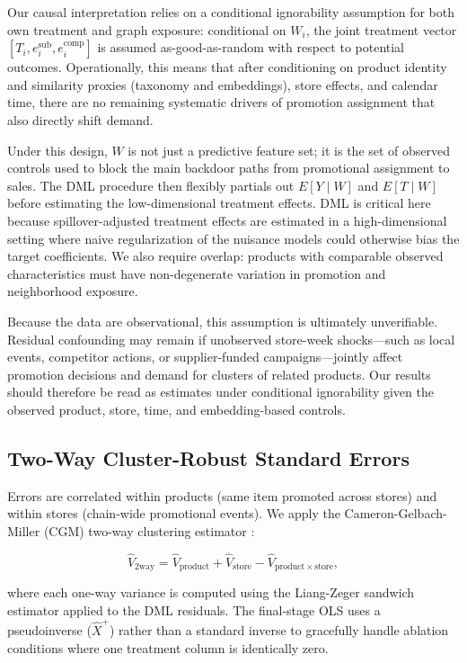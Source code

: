 \documentclass[conference]{IEEEtran}
\begin{document}
Our causal interpretation relies on a conditional ignorability assumption for
both own treatment and graph exposure: conditional on $W_i$, the joint
treatment vector $[T_i, e_i^{\mathrm{sub}}, e_i^{\mathrm{comp}}]$ is assumed
as-good-as-random with respect to potential outcomes.
Operationally, this means that after conditioning on product identity and
similarity proxies (taxonomy and embeddings), store effects, and calendar
time, there are no remaining systematic drivers of promotion assignment that
also directly shift demand.

Under this design, $W$ is not just a predictive feature set; it is the set of
observed controls used to block the main backdoor paths from promotional
assignment to sales.
The DML procedure then flexibly partials out $E[Y \mid W]$ and
$E[T \mid W]$ before estimating the low-dimensional treatment effects.
DML is critical here because spillover-adjusted treatment effects are
estimated in a high-dimensional setting where naive regularization of the
nuisance models could otherwise bias the target coefficients.
We also require overlap: products with comparable observed characteristics
must have non-degenerate variation in promotion and neighborhood exposure.

Because the data are observational, this assumption is ultimately
unverifiable.
Residual confounding may remain if unobserved store-week shocks---such as
local events, competitor actions, or supplier-funded campaigns---jointly
affect promotion decisions and demand for clusters of related products.
Our results should therefore be read as estimates under conditional
ignorability given the observed product, store, time, and embedding-based
controls.

\subsection{Two-Way Cluster-Robust Standard Errors}

Errors are correlated within products (same item promoted across stores)
and within stores (chain-wide promotional events).
We apply the Cameron-Gelbach-Miller (CGM) two-way clustering
estimator \cite{cameron2011robust}:

\begin{equation}
    \hat{V}_{\mathrm{2way}} = \hat{V}_{\mathrm{product}}
    + \hat{V}_{\mathrm{store}}
    - \hat{V}_{\mathrm{product}\times\mathrm{store}},
    \label{eq:cgm}
\end{equation}

\noindent where each one-way variance is computed using the Liang-Zeger
sandwich estimator \cite{liang1986longitudinal} applied to the
DML residuals.
The final-stage OLS uses a pseudoinverse ($\hat{X}^+$) rather than a
standard inverse to gracefully handle ablation conditions where one
treatment column is identically zero.
\end{document}
